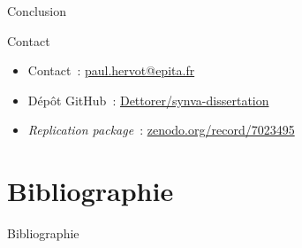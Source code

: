 \documentclass[usenames,dvipsnames,10pt]{beamer}
\begin{document}
\begin{frame}{Conclusion}
\end{frame}

\begin{frame}{Contact}
    \begin{itemize}
        \item Contact : \href{mailto:paul.hervot@epita.fr}{paul.hervot@epita.fr}
        \item Dépôt GitHub :
            \href{https://github.com/Dettorer/synva-dissertation}{Dettorer/synva-dissertation}
        \item \emph{Replication package} :
            \href{https://zenodo.org/record/7023495}{zenodo.org/record/7023495}
    \end{itemize}

\end{frame}

\section{Bibliographie}

\begin{frame}[allowframebreaks]{Bibliographie}
    \printbibliography{}
\end{frame}
\end{document}
